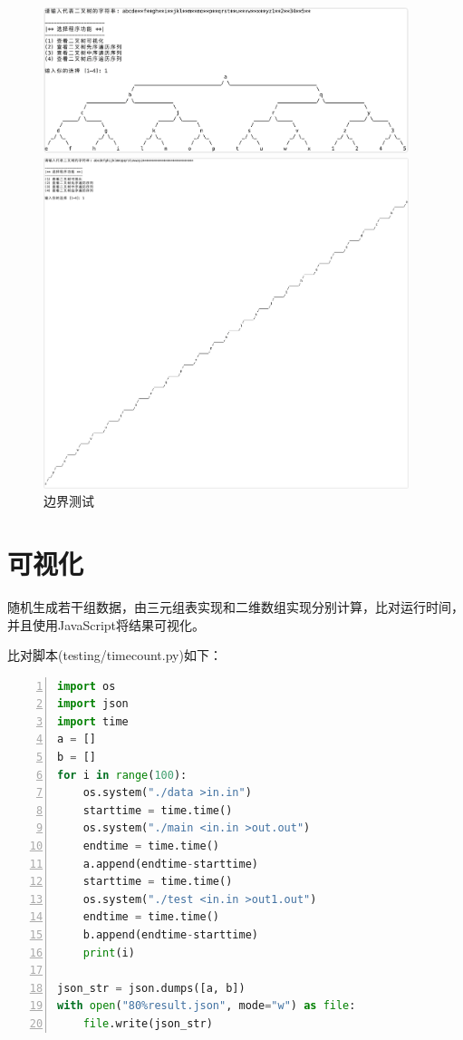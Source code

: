 \documentclass{article}
\begin{document}
\begin{figure}[htbp]

    \centering\includegraphics[width=0.95\textwidth]{./Images/sample5.png}

    \centering\includegraphics[width=0.95\textwidth]{./Images/sample6.png}

    \caption{边界测试}

\end{figure}

\section{可视化}

随机生成若干组数据，由三元组表实现和二维数组实现分别计算，比对运行时间，并且使用JavaScript将结果可视化。

比对脚本(testing/timecount.py)如下：

\begin{lstlisting}[language={python},
    numbers=left,
    numberstyle=\tiny\consolas,
    basicstyle=\small\consolas]
import os
import json
import time
a = []
b = []
for i in range(100):
    os.system("./data >in.in")
    starttime = time.time()
    os.system("./main <in.in >out.out")
    endtime = time.time()
    a.append(endtime-starttime)
    starttime = time.time()
    os.system("./test <in.in >out1.out")
    endtime = time.time()
    b.append(endtime-starttime)
    print(i)

json_str = json.dumps([a, b])
with open("80%result.json", mode="w") as file:
    file.write(json_str)
\end{lstlisting}
\end{document}

